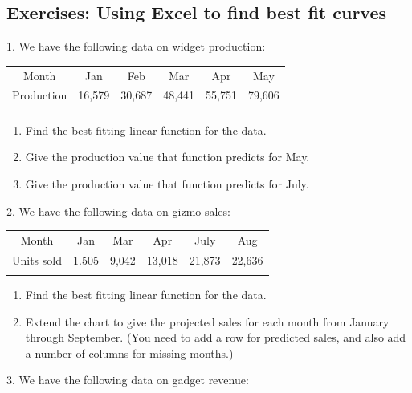 \documentclass[10pt,]{book}
\theoremstyle{plain}
\theoremstyle{definition}
\theoremstyle{definition}
\newcommand{\hrulethin}  {\noalign{\hrule height 0.04em}}
\newcommand{\hrulemedium}{\noalign{\hrule height 0.07em}}
\newcommand{\hrulethick} {\noalign{\hrule height 0.11em}}
\begin{document}
\subsection[{Exercises: Using Excel to find best fit curves}]{Exercises: Using Excel to find best fit curves}\label{exercises-set-sec-1-5}
\begin{exerciselist}
\item[1.]\hypertarget{exercise-64}{}  We have the following data on widget production:
%
\leavevmode%
\begin{table}
\centering
\begin{tabular}{cccccc}\hrulethick
Month&Jan&Feb&Mar&Apr&May\tabularnewline\hrulethin
Production&16,579&30,687&48,441&55,751&79,606\tabularnewline\hrulemedium
\end{tabular}
\end{table}
\leavevmode%
\begin{enumerate}[label=(\alph*)]
\item\hypertarget{li-79}{} Find the best fitting linear function for the data.%
\item\hypertarget{li-80}{} Give the production value that function predicts for May.%
\item\hypertarget{li-81}{} Give the production value that function predicts for July.%
\end{enumerate}
\par\smallskip
\item[2.]\hypertarget{exercise-65}{}  We have the following data on gizmo sales:
%
\leavevmode%
\begin{table}
\centering
\begin{tabular}{cccccc}\hrulethick
Month&Jan&Mar&Apr&July&Aug\tabularnewline\hrulethin
Units sold&1.505&9,042&13,018&21,873&22,636\tabularnewline\hrulemedium
\end{tabular}
\end{table}
\leavevmode%
\begin{enumerate}[label=(\alph*)]
\item\hypertarget{li-82}{} Find the best fitting linear function for the data.%
\item\hypertarget{li-83}{} Extend the chart to give the projected sales for each month from January through September.  (You need to add a row for predicted sales, and also add a number of columns for missing months.)%
\end{enumerate}
\par\smallskip
\item[3.]\hypertarget{exercise-66}{}  We have the following data on gadget revenue:

\end{exerciselist}
\end{document}
